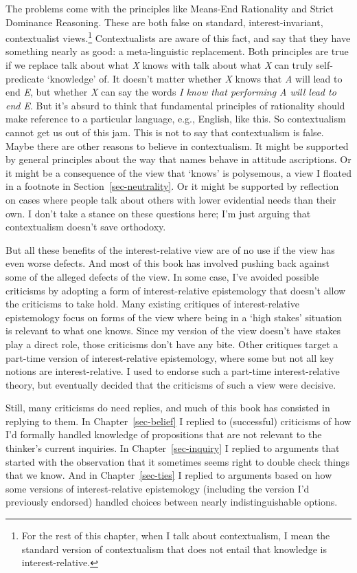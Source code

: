 \documentclass[
  12pt,
  letterpaper,
]{scrbook}
\begin{document}
The problems come with the principles like Means-End Rationality and
Strict Dominance Reasoning. These are both false on standard,
interest-invariant, contextualist views.\footnote{For the rest of this
  chapter, when I talk about contextualism, I mean the standard version
  of contextualism that does not entail that knowledge is
  interest-relative.} Contextualists are aware of this fact, and say
that they have something nearly as good: a meta-linguistic replacement.
Both principles are true if we replace talk about what \emph{X} knows
with talk about what \emph{X} can truly self-predicate `knowledge' of.
It doesn't matter whether \emph{X} knows that \emph{A} will lead to end
\emph{E}, but whether \emph{X} can say the words \emph{I know that
performing A will lead to end E}. But it's absurd to think that
fundamental principles of rationality should make reference to a
particular language, e.g., English, like this. So contextualism cannot
get us out of this jam. This is not to say that contextualism is false.
Maybe there are other reasons to believe in contextualism. It might be
supported by general principles about the way that names behave in
attitude ascriptions. Or it might be a consequence of the view that
`knows' is polysemous, a view I floated in a footnote in
Section~\ref{sec-neutrality}. Or it might be supported by reflection on
cases where people talk about others with lower evidential needs than
their own. I don't take a stance on these questions here; I'm just
arguing that contextualism doesn't save orthodoxy.

But all these benefits of the interest-relative view are of no use if
the view has even worse defects. And most of this book has involved
pushing back against some of the alleged defects of the view. In some
case, I've avoided possible criticisms by adopting a form of
interest-relative epistemology that doesn't allow the criticisms to take
hold. Many existing critiques of interest-relative epistemology focus on
forms of the view where being in a `high stakes' situation is relevant
to what one knows. Since my version of the view doesn't have stakes play
a direct role, those criticisms don't have any bite. Other critiques
target a part-time version of interest-relative epistemology, where some
but not all key notions are interest-relative. I used to endorse such a
part-time interest-relative theory, but eventually decided that the
criticisms of such a view were decisive.

Still, many criticisms do need replies, and much of this book has
consisted in replying to them. In Chapter~\ref{sec-belief} I replied to
(successful) criticisms of how I'd formally handled knowledge of
propositions that are not relevant to the thinker's current inquiries.
In Chapter~\ref{sec-inquiry} I replied to arguments that started with
the observation that it sometimes seems right to double check things
that we know. And in Chapter~\ref{sec-ties} I replied to arguments based
on how some versions of interest-relative epistemology (including the
version I'd previously endorsed) handled choices between nearly
indistinguishable options.
\end{document}
